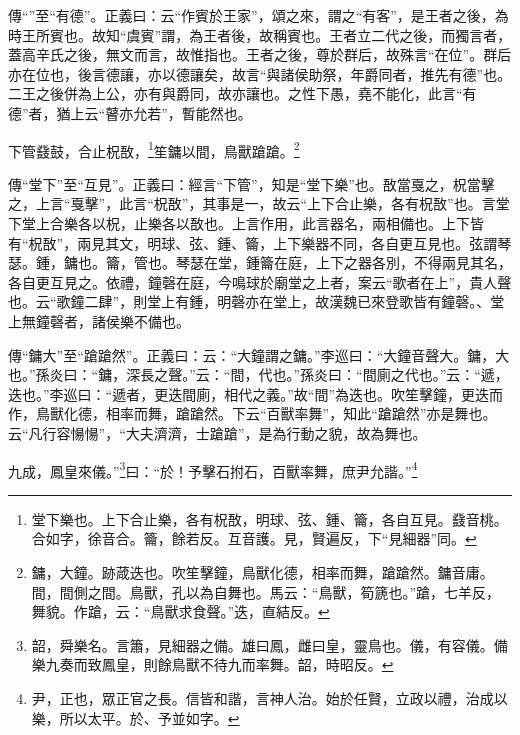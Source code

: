 {\noindent\zhuan{}\fzbyks 傳“”至“有德”。正義曰：云“作賓於王家”，頌之來，謂之“有客”，是王者之後，為時王所賓也。故知“虞賓”謂，為王者後，故稱賓也。王者立二代之後，而獨言者，蓋高辛氏之後，無文而言，故惟指也。王者之後，尊於群后，故殊言“在位”。群后亦在位也，後言德讓，亦以德讓矣，故言“與諸侯助祭，年爵同者，推先有德”也。二王之後併為上公，亦有與爵同，故亦讓也。之性下愚，堯不能化，此言“有德”者，猶上云“瞽亦允若”，暫能然也。 \par}

下管鼗鼓，合止柷敔，\footnote{堂下樂也。上下合止樂，各有柷敔，明球、弦、鍾、籥，各自互見。鼗音桃。合如字，徐音合。籥，餘若反。互音護。見，賢遍反，下“見細器”同。}笙鏞以間，鳥獸蹌蹌。\footnote{鏞，大鐘。跡葴迭也。吹笙擊鐘，鳥獸化德，相率而舞，蹌蹌然。鏞音庸。間，間側之間。鳥獸，孔以為自舞也。馬云：“鳥獸，筍篪也。”蹌，七羊反，舞貌。作蹌，云：“鳥獸求食聲。”迭，直結反。}


{\noindent\zhuan{}\fzbyks 傳“堂下”至“互見”。正義曰：經言“下管”，知是“堂下樂”也。敔當戛之，柷當擊之，上言“戛擊”，此言“柷敔”，其事是一，故云“上下合止樂，各有柷敔”也。言堂下堂上合樂各以柷，止樂各以敔也。上言作用，此言器名，兩相備也。上下皆有“柷敔”，兩見其文，明球、弦、鍾、籥，上下樂器不同，各自更互見也。弦謂琴瑟。鍾，鏞也。籥，管也。琴瑟在堂，鍾籥在庭，上下之器各別，不得兩見其名，各自更互見之。依禮，鐘磬在庭，今鳴球於廟堂之上者，案云“歌者在上”，貴人聲也。云“歌鐘二肆”，則堂上有鍾，明磬亦在堂上，故漢魏已來登歌皆有鐘磬。、堂上無鐘磬者，諸侯樂不備也。 \par}

{\noindent\zhuan{}\fzbyks 傳“鏞大”至“蹌蹌然”。正義曰：云：“大鐘謂之鏞。”李巡曰：“大鐘音聲大。鏞，大也。”孫炎曰：“鏞，深長之聲。”云：“間，代也。”孫炎曰：“間廁之代也。”云：“遞，迭也。”李巡曰：“遞者，更迭間廁，相代之義。”故“間”為迭也。吹笙擊鐘，更迭而作，鳥獸化德，相率而舞，蹌蹌然。下云“百獸率舞”，知此“蹌蹌然”亦是舞也。云“凡行容愓愓”，“大夫濟濟，士蹌蹌”，是為行動之貌，故為舞也。 \par}

九成，鳳皇來儀。”\footnote{韶，舜樂名。言簫，見細器之備。雄曰鳳，雌曰皇，靈鳥也。儀，有容儀。備樂九奏而致鳳皇，則餘鳥獸不待九而率舞。韶，時昭反。}曰：“於！予擊石拊石，百獸率舞，庶尹允諧。”\footnote{尹，正也，眾正官之長。信皆和諧，言神人治。始於任賢，立政以禮，治成以樂，所以太平。於、予並如字。}

